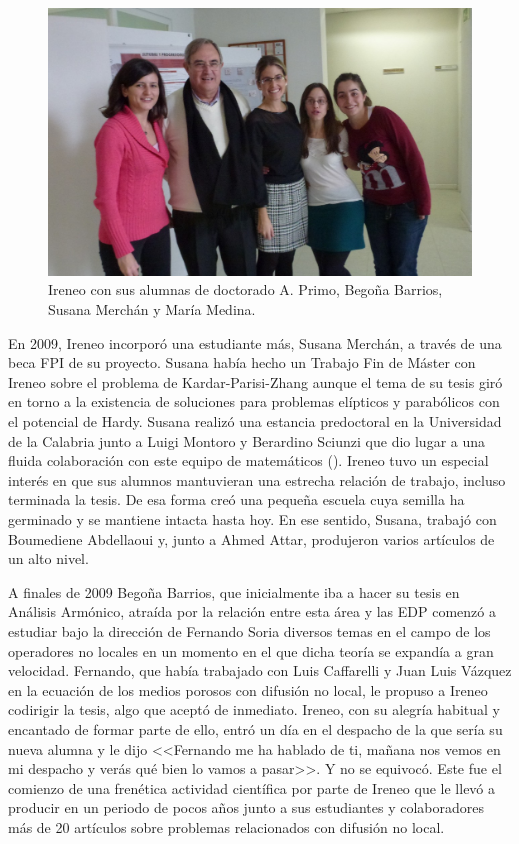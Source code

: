 \begin{figure}%
\begin{center}
\includegraphics[width=0.9\linewidth]{IP_foto_Alumnas.jpeg}
\caption{Ireneo con sus alumnas de doctorado  A. Primo, Bego\~na Barrios, Susana Merch\'an y Mar\'ia Medina.}
\end{center}
\end{figure}
	
 
 En 2009, Ireneo incorpor\'o una estudiante m\'as, Susana Merch\'an, a trav\'es de una beca FPI de su proyecto. Susana hab\'ia hecho un Trabajo Fin de M\'aster con Ireneo sobre el problema de Kardar-Parisi-Zhang aunque el tema de su tesis gir\'o en torno a la existencia de soluciones para problemas el\'ipticos y parab\'olicos con el potencial de Hardy. Susana realiz\'o una estancia predoctoral en la Universidad de la Calabria junto a Luigi Montoro y Berardino Sciunzi que dio lugar a una fluida colaboraci\'on con este equipo de matem\'aticos {(\cite{MMPS})}. Ireneo tuvo un especial inter\'es en que sus alumnos mantuvieran una estrecha relaci\'on de trabajo, incluso terminada la tesis. De esa forma cre\'o una peque\~na escuela cuya semilla ha germinado y  se mantiene intacta hasta hoy. En ese sentido, Susana, trabaj\'o con Boumediene Abdellaoui y, junto a Ahmed Attar, produjeron varios art\'iculos de un alto nivel.

A finales de 2009 Bego\~na Barrios, que inicialmente iba a hacer su tesis en An\'alisis Arm\'onico, atra\'ida por la relaci\'on entre esta \'area y las EDP comenz\'o a estudiar bajo la direcci\'on de Fernando Soria diversos temas en el campo de los operadores no locales en un momento en el que dicha teor\'ia se expand\'ia a gran velocidad. Fernando, que hab\'ia trabajado con Luis Caffarelli y Juan Luis V\'azquez en la ecuaci\'on de los medios porosos con difusi\'on no local, le propuso a Ireneo codirigir la tesis, algo que  acept\'o de inmediato.  Ireneo, con su alegr\'ia habitual y encantado de formar parte de ello, entr\'o un d\'ia en el despacho de la que ser\'ia su nueva alumna y le dijo <<Fernando me ha hablado de ti, ma\~nana nos vemos en mi despacho y ver\'as qu\'e bien lo vamos a pasar>>. Y no se equivoc\'o. Este fue el comienzo de una fren\'etica actividad cient\'ifica por parte de Ireneo que le llev\'o a producir en un periodo de pocos a\~nos junto a sus estudiantes y colaboradores m\'as de 20 art\'iculos sobre problemas relacionados con difusi\'on no local.   


